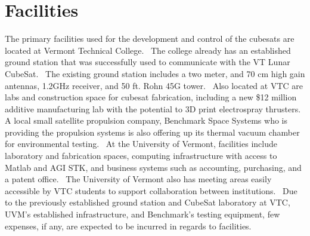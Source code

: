 \section{Facilities}

The primary facilities used for the development and control of the
cubesats are located at Vermont Technical College.  The college
already has an established ground station that was successfully used
to communicate with the VT Lunar CubeSat.  The existing ground station
includes a two meter, and 70 cm high gain antennas, 1.2GHz receiver,
and 50 ft. Rohn 45G tower.  Also located at VTC are labs and
construction space for cubesat fabrication, including a new \$12
million additive manufacturing lab with the potential to 3D print
electrospray thrusters.  A local small satellite propulsion company,
Benchmark Space Systems who is providing the propulsion systems is
also offering up its thermal vacuum chamber for environmental
testing.  At the University of Vermont, facilities include laboratory
and fabrication spaces, computing infrastructure with access to Matlab
and AGI STK, and business systems such as accounting, purchasing, and
a patent office.  The University of Vermont also has meeting areas
easily accessible by VTC students to support collaboration between
institutions.  Due to the previously established ground station and
CubeSat laboratory at VTC, UVM’s established infrastructure, and
Benchmark’s testing equipment, few expenses, if any, are expected to
be incurred in regards to facilities.
